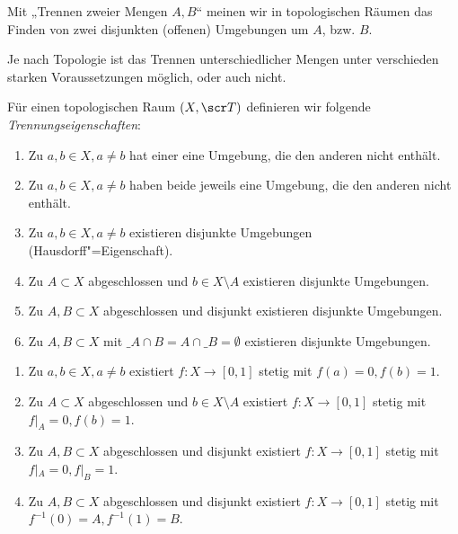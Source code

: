 Mit „Trennen zweier Mengen $A, B$“ meinen wir in topologischen Räumen das Finden von zwei disjunkten (offenen) Umgebungen um $A$, bzw. $B$.

Je nach Topologie ist das Trennen unterschiedlicher Mengen unter verschieden starken Voraussetzungen möglich, oder auch nicht.

\begin{df}[Trennungsaxiome] \label{df:separation_axioms}
	Für einen topologischen Raum $(X, \scr T)$ definieren wir folgende \emph{Trennungseigenschaften}:
	\begin{enumerate}[label=(\SepAxiom{\arabic*}),start=0,leftmargin=3.5em,series=sepaxioms]
		\item
			Zu $a, b \in X, a \neq b$ hat einer eine Umgebung, die den anderen nicht enthält.
		\item
			Zu $a, b \in X, a \neq b$ haben beide jeweils eine Umgebung, die den anderen nicht enthält.
		\item
			Zu $a, b \in X, a \neq b$ existieren disjunkte Umgebungen (Hausdorff"=Eigenschaft).
		\item
			Zu $A \subset X$ abgeschlossen und $b \in X \setminus A$ existieren disjunkte Umgebungen.
		\item
			Zu $A, B \subset X$ abgeschlossen und disjunkt existieren disjunkte Umgebungen.
		\item
			Zu $A, B \subset X$ mit $\_A \cap B = A \cap \_B = \emptyset$ existieren disjunkte Umgebungen.
	\end{enumerate}
	\begin{enumerate}[label=(\SepAxiom{\arabic*\sfrac12}),resume*=sepaxioms,start=2]
		\item
			Zu $a, b \in X, a \neq b$ existiert $f: X \to [0,1]$ stetig mit $f(a) = 0, f(b) = 1$.
		\item
			Zu $A \subset X$ abgeschlossen und $b \in X \setminus A$ existiert $f: X \to [0,1]$ stetig mit $f|_A = 0, f(b) = 1$.
		\item
			Zu $A, B \subset X$ abgeschlossen und disjunkt existiert $f: X \to [0,1]$ stetig mit $f|_A = 0, f|_B = 1$.
		\item
			Zu $A, B \subset X$ abgeschlossen und disjunkt existiert $f: X \to [0,1]$ stetig mit $f^{-1}(0) = A, f^{-1}(1) = B$.
	\end{enumerate}
\end{df}

